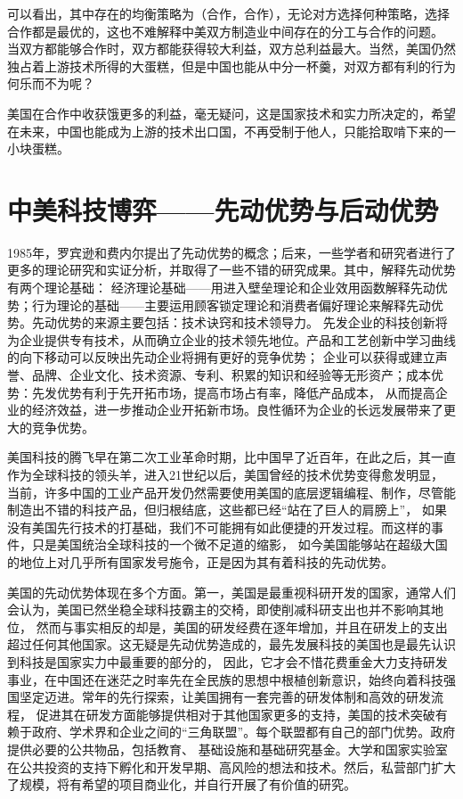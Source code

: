 \documentclass[UTF8]{article}
\begin{document}
    可以看出，其中存在的均衡策略为（合作，合作），无论对方选择何种策略，选择合作都是最优的，这也不难解释中美双方制造业中间存在的分工与合作的问题。
    当双方都能够合作时，双方都能获得较大利益，双方总利益最大。当然，美国仍然独占着上游技术所得的大蛋糕，但是中国也能从中分一杯羹，对双方都有利的行为何乐而不为呢？

    美国在合作中收获饿更多的利益，毫无疑问，这是国家技术和实力所决定的，希望在未来，中国也能成为上游的技术出口国，不再受制于他人，只能拾取啃下来的一小块蛋糕。

    \section{中美科技博弈——先动优势与后动优势}

    1985年，罗宾逊和费内尔提出了先动优势的概念；后来，一些学者和研究者进行了更多的理论研究和实证分析，并取得了一些不错的研究成果。其中，解释先动优势有两个理论基础：
    经济理论基础——用进入壁垒理论和企业效用函数解释先动优势；行为理论的基础——主要运用顾客锁定理论和消费者偏好理论来解释先动优势。先动优势的来源主要包括：技术诀窍和技术领导力。
    先发企业的科技创新将为企业提供专有技术，从而确立企业的技术领先地位。产品和工艺创新中学习曲线的向下移动可以反映出先动企业将拥有更好的竞争优势；
    企业可以获得或建立声誉、品牌、企业文化、技术资源、专利、积累的知识和经验等无形资产；成本优势：先发优势有利于先开拓市场，提高市场占有率，降低产品成本，
    从而提高企业的经济效益，进一步推动企业开拓新市场。良性循环为企业的长远发展带来了更大的竞争优势。

    美国科技的腾飞早在第二次工业革命时期，比中国早了近百年，在此之后，其一直作为全球科技的领头羊，进入21世纪以后，美国曾经的技术优势变得愈发明显，
    当前，许多中国的工业产品开发仍然需要使用美国的底层逻辑编程、制作，尽管能制造出不错的科技产品，但归根结底，这些都已经“站在了巨人的肩膀上”，
    如果没有美国先行技术的打基础，我们不可能拥有如此便捷的开发过程。而这样的事件，只是美国统治全球科技的一个微不足道的缩影，
    如今美国能够站在超级大国的地位上对几乎所有国家发号施令，正是因为其有着科技的先动优势。

    美国的先动优势体现在多个方面。第一，美国是最重视科研开发的国家，通常人们会认为，美国已然坐稳全球科技霸主的交椅，即使削减科研支出也并不影响其地位，
    然而与事实相反的却是，美国的研发经费在逐年增加，并且在研发上的支出超过任何其他国家。这无疑是先动优势造成的，最先发展科技的美国也是最先认识到科技是国家实力中最重要的部分的，
    因此，它才会不惜花费重金大力支持研发事业，在中国还在迷茫之时率先在全民族的思想中根植创新意识，始终向着科技强国坚定迈进。常年的先行探索，让美国拥有一套完善的研发体制和高效的研发流程，
    促进其在研发方面能够提供相对于其他国家更多的支持，美国的技术突破有赖于政府、学术界和企业之间的“三角联盟”。每个联盟都有自己的部门优势。政府提供必要的公共物品，包括教育、
    基础设施和基础研究基金。大学和国家实验室在公共投资的支持下孵化和开发早期、高风险的想法和技术。然后，私营部门扩大了规模，将有希望的项目商业化，并自行开展了有价值的研究。
\end{document}
